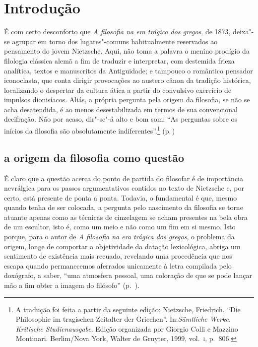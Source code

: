 
\chapter[Introdução, por Fernando R. de Moraes Barros]{Introdução}

É com certo desconforto que \textit{A filosofia na era trágica dos
 gregos}, de 1873, deixa"-se agrupar em torno dos lugares"-comuns
 habitualmente reservados ao pensamento do jovem Nietzsche. Aqui, não toma a
 palavra o menino prodígio da filologia clássica alemã a fim de traduzir e
 interpretar, com destemida frieza analítica, textos e manuscritos da
 Antiguidade; e tampouco o romântico pensador iconoclasta, que conta dirigir
 provocações ao austero cânon da tradição histórica, localizando o despertar
 da cultura ática a partir do convulsivo exercício de impulsos dionisíacos.
 Aliás, a própria pergunta pela origem da filosofia, se não se acha
 desatendida, é ao menos desestabilizada em termos de sua convencional
 decifração. Não por acaso, dir"-se"-á alto e bom som: ``As perguntas sobre
 os inícios da filosofia são absolutamente indiferentes''.\footnote {A
 tradução foi feita a partir da seguinte edição: Nietzsche, Friedrich. ``Die
 Philosophie im tragischen Zeitalter der Griechen''. In:\textit{Sämtliche Werke}. 
 \textit{Kritische Studienausgabe}. Edição organizada por Giorgio Colli e 
 Mazzino Montinari. Berlim/Nova York, Walter de Gruyter,
 1999, vol.~\textsc{i}, p.~806.} (p.\,\pageref{perguntassobreosinicios}) 

\section{a origem da filosofia como questão} 

É claro que a questão acerca do ponto de partida do filosofar é de importância nevrálgica para os passos
 argumentativos contidos no texto de Nietzsche e, por certo, está presente de
 ponta a ponta. Todavia, o fundamental é que, mesmo quando tenha de ser
 colocada, a pergunta pelo nascimento da filosofia se torne atuante apenas
 como as técnicas de cinzelagem se acham presentes na bela obra de um
 escultor, isto é, como um meio e não como um fim em si mesmo. Isto porque,
 para o autor de
\textit{A filosofia na era trágica dos gregos}, o problema da origem, longe de
 comportar a objetividade da datação lexicológica, abriga um sentimento de
 existência mais recuado, revelando uma procedência que nos escapa quando
 permanecemos aferrados unicamente à letra compilada pelo doxógrafo, a saber,
 ``uma atmosfera pessoal, uma coloração de que se pode lançar mão a fim obter
 a imagem do filósofo'' (p.~\pageref{atmosferapessoal}). 

